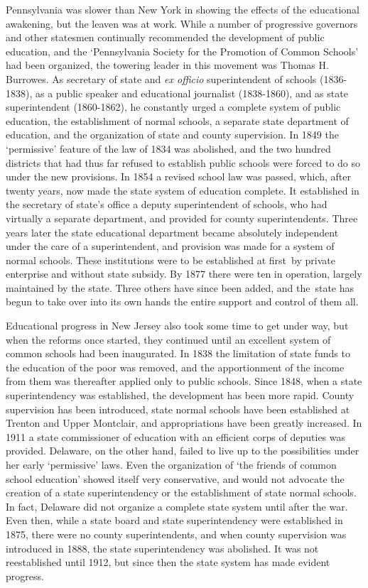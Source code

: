 \documentclass[
]{book}
\begin{document}
Pennsylvania was slower than New York in showing the effects of the educational awakening, but the leaven was at work. While a number of progressive governors and other statesmen continually recommended the development of public education, and the `Pennsylvania Society for the Promotion of Common Schools' had been organized, the towering leader in this movement was Thomas H. Burrowes. As secretary of state and \emph{ex officio} superintendent of schools (1836-1838), as a public speaker and educational journalist (1838-1860), and as state superintendent (1860-1862), he constantly urged a complete system of public education, the establishment of normal schools, a separate state department of education, and the organization of state and county supervision. In 1849 the `permissive' feature of the law of 1834 was abolished, and the two hundred districts that had thus far refused to establish public schools were forced to do so under the new provisions. In 1854 a revised school law was passed, which, after twenty years, now made the state system of education complete. It established in the secretary of state's office a deputy superintendent of schools, who had virtually a separate department, and provided for county superintendents. Three years later the state educational department became absolutely independent under the care of a superintendent, and provision was made for a system of normal schools. These institutions were to be established at first~by private enterprise and without state subsidy. By 1877 there were ten in operation, largely maintained by the state. Three others have since been added, and the~state has begun to take over into its own hands the entire support and control of them all.

Educational progress in New Jersey also took some time to get under way, but when the reforms once started, they continued until an excellent system of common schools had been inaugurated. In 1838 the limitation of state funds to the education of the poor was removed, and the apportionment of the income from them was thereafter applied only to public schools. Since 1848, when a state superintendency was established, the development has been more rapid. County supervision has been introduced, state normal schools have been established at Trenton and Upper Montclair, and appropriations have been greatly increased. In 1911 a state commissioner of education with an efficient corps of deputies was provided. Delaware, on the other hand, failed to live up to the possibilities under her early `permissive' laws. Even the organization of `the friends of common school education' showed itself very conservative, and would not advocate the creation of a state superintendency or the establishment of state normal schools. In fact, Delaware did not organize a complete state system until after the war. Even then, while a state board and state superintendency were established in 1875, there were no county superintendents, and when county supervision was introduced in 1888, the state superintendency was abolished. It was not reestablished until 1912, but since then the state system has made evident progress.
\end{document}
